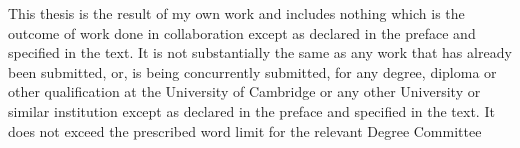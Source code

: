 
\begin{declaration}

    This thesis is the result of my own work and includes nothing which is the outcome of work done in collaboration except as declared in the preface and specified in the text. It is not substantially the same as any work that has already been submitted, or, is being concurrently submitted, for any degree, diploma or other qualification at the University of Cambridge or any other University or similar institution except as declared in the preface and specified in the text. It does not exceed the prescribed word limit for the relevant Degree Committee


\end{declaration}

